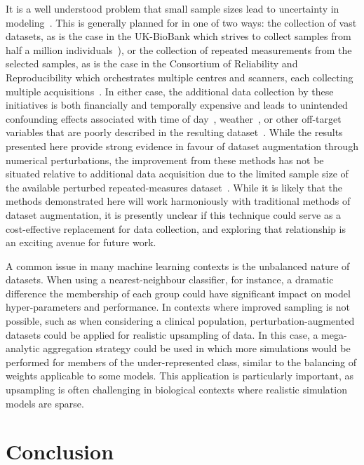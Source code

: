 \documentclass[10pt]{SelfArx} %
\begin{document}
It is a well understood problem that small sample sizes lead to uncertainty in modeling~\cite{varoquaux2018cross}.
This is generally planned for in one of two ways: the collection of vast datasets, as is the case in the UK-BioBank
which strives to collect samples from half a million individuals~\cite{sudlow2015uk}), or the collection of repeated
measurements from the selected samples, as is the case in the Consortium of Reliability and Reproducibility which
orchestrates multiple centres and scanners, each collecting multiple acquisitions~\cite{zuo2014open}. In either case,
the additional data collection by these initiatives is both financially and temporally expensive and leads to
unintended confounding effects associated with time of day~\cite{vandewalle2009functional},
weather~\cite{di2019estimations}, or other off-target variables that are poorly described in the resulting
dataset~\cite{chaddock2010neuroimaging}. While the results presented here provide strong evidence in favour of dataset
augmentation through numerical perturbations, the improvement from these methods has not be situated relative to
additional data acquisition due to the limited sample size of the available perturbed repeated-measures
dataset~\cite{Kiar2020-yz}. While it is likely that the methods demonstrated here will work harmoniously with
traditional methods of dataset augmentation, it is presently unclear if this technique could serve as a cost-effective
replacement for data collection, and exploring that relationship is an exciting avenue for future work.

A common issue in many machine learning contexts is the unbalanced nature of datasets. When using a nearest-neighbour
classifier, for instance, a dramatic difference the membership of each group could have significant impact on model
hyper-parameters and performance. In contexts where improved sampling is not possible, such as when considering a
clinical population, perturbation-augmented datasets could be applied for realistic upsampling of data. In this case, a
mega-analytic aggregation strategy could be used in which more simulations would be performed for members of the
under-represented class, similar to the balancing of weights applicable to some models. This application is
particularly important, as upsampling is often challenging in biological contexts where realistic simulation models are
sparse.


\section*{Conclusion}
\end{document}
